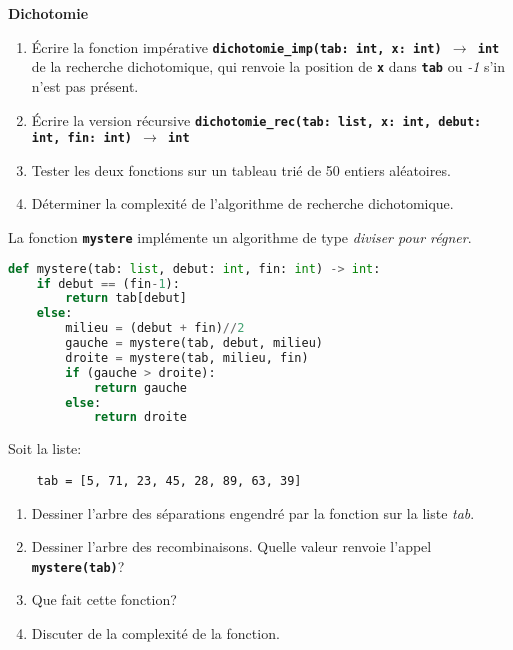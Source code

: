 \documentclass[a4paper,11pt]{article}
\begin{document}
\begin{exo}\textbf{Dichotomie}
    \begin{enumerate}
        \item Écrire la fonction impérative \textbf{\texttt{dichotomie\_imp(tab: int, x: int) $\rightarrow$ int}} de la recherche dichotomique, qui renvoie la position de \textbf{\texttt{x}} dans \textbf{\texttt{tab}} ou \emph{-1} s'in n'est pas présent.
        \item Écrire la version récursive \textbf{\texttt{dichotomie\_rec(tab: list, x: int, debut: int, fin: int) $\rightarrow$ int}}
        \item Tester les deux fonctions sur un tableau trié de 50 entiers aléatoires.
        \item Déterminer la complexité de l'algorithme de recherche dichotomique.
    \end{enumerate}
\end{exo}
\begin{exo}
    La fonction \textbf{\texttt{mystere}} implémente un algorithme de type \emph{diviser pour régner}.
\begin{center}
\begin{lstlisting}[language=Python  , xleftmargin=2em, xrightmargin=2em]
def mystere(tab: list, debut: int, fin: int) -> int:
    if debut == (fin-1):
        return tab[debut]
    else:
        milieu = (debut + fin)//2
        gauche = mystere(tab, debut, milieu)
        droite = mystere(tab, milieu, fin)
        if (gauche > droite):
            return gauche
        else:
            return droite
\end{lstlisting}
\end{center}
    Soit la liste:
    \begin{lstlisting}
    tab = [5, 71, 23, 45, 28, 89, 63, 39]
\end{lstlisting}
    \begin{enumerate}
    \item Dessiner l'arbre des séparations engendré par la fonction sur la liste \emph{tab}.
    \item Dessiner l'arbre des recombinaisons. Quelle valeur renvoie l'appel \texttt{\textbf{mystere(tab)}}?
    \item Que fait cette fonction?
    \item Discuter de la complexité de la fonction.
    \end{enumerate}
    \end{exo}
\end{document}
